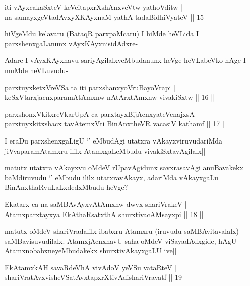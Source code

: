 \begin{shl}
iti vAyxcakaSxteV keVcitapxrXshAnxveVtw yathoVditw |\\
na samayxgeVtadAvxyXKAyxnaM yathA tadaBidhiVyateV \hfill || 15 ||
\end{shl}

\begin{artha}
hiVgeMdu kelavaru (BataqR parxpaMcaru) I hiMde heVLida I parxshenxgaLanunx vAyxKAyxnisidAdxre-

Adare I vAyxKAyxnavu sariyAgilalxveMbudanunx heVge heVLabeVko hAge I muMde heVLuvudu-
\end{artha}

\begin{shl}
parxtuyxketxVreVSa ta iti parxshanxyoVruBayoVrapi |\\
keSxVtarxjacnxparamAtAmxnw nAtArx\s \s tAmxnw vivakiSxtw \hfill || 16 ||
\end{shl}

\begin{shl}
parxshonxVkitxreVkarUpA ca parxtayxBijAcnxyateV\s cnajxsA |\\
parxtuyxkitxshacx tavA\s \s temxVti BinAnxtheVR vacasiV kathamf \hfill || 17 ||
\end{shl}

\begin{artha}
I eraDu parxshenxgaLigU `\stext ' eMbudAgi utatxra vAkayxviruvudariMda jiVvaparamAtamxru ililx AtamxgaLeMbudu vivakiSxtavAgilalx|| 

matutx utatxra vAkayxvu oMdeV rUpavAgidunx savxrasavAgi anuBavakekx baMdiruvudu `\stext ' eMbudu ililx utatxravAkayx, adariMda vAkayxgaLu BinAnxthaRvuLaLxdedxMbudu heVge?
\end{artha}%

\begin{shl}
Ekatarx ca na saMBAvAyxvAtAmxnw dwvx shariVrakeV |\\
Atamxparxtayxya EkAthaRsatxthA shurxtivacAMsayxpi \hfill || 18 ||
\end{shl}

\begin{artha}
matutx oMdeV shariVradalilx ibabxru Atamxru (iruvudu saMBAvitavalalx) saMBavisuvudilalx. AtamxjAcnxnavU saha oMdeV viSayadAdxgide, hAgU AtamxnobabxneyeMbudakekx shurxtivAkayxgaLU ive||
\end{artha}

\begin{shl}
EkAtamxkAH savaRdeVhA vivAdoV yeVSu vataRteV |\\
shariVratAvxvisheVSatAvxtapxrXtivAdishariVravatf \hfill || 19 ||
\end{shl}

